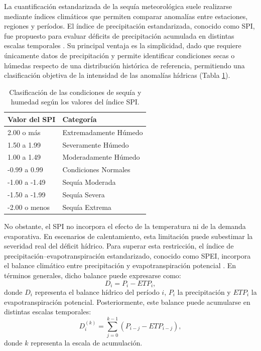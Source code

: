 \documentclass[11pt,a4paper]{article}
\begin{document}
La cuantificación estandarizada de la sequía meteorológica suele realizarse mediante índices climáticos que permiten comparar anomalías entre estaciones, regiones y períodos. El índice de precipitación estandarizada, conocido como SPI, fue propuesto para evaluar déficits de precipitación acumulada en distintas escalas temporales \citep{mckee1993}. Su principal ventaja
es la simplicidad, dado que requiere únicamente datos de precipitación y permite identificar condiciones secas o húmedas respecto de una distribución histórica de referencia, permitiendo una clasificación objetiva de la intensidad de las anomalías hídricas (Tabla \ref{tab:clasificacion_spi}).
\begin{table}[ht!]
    \centering
    \begin{threeparttable}
    \caption{Clasificación de las condiciones de sequía y humedad según los valores del índice SPI.}
    \label{tab:clasificacion_spi}
    \vspace{-0.5cm}
    \singlespacing %
    \small         %
    \begin{tabular}{p{5cm}p{4.5cm}}
    \hline\hline
    \textbf{Valor del SPI} & \textbf{Categoría} \\ \hline
    2.00 o más & Extremadamente Húmedo \\
    1.50 a 1.99 & Severamente Húmedo \\
    1.00 a 1.49 & Moderadamente Húmedo \\
    -0.99 a 0.99 & Condiciones Normales \\
    -1.00 a -1.49 & Sequía Moderada \\
    -1.50 a -1.99 & Sequía Severa \\
    -2.00 o menos & Sequía Extrema \\ \hline\hline
    \end{tabular}
    \end{threeparttable}
\end{table}

No obstante, el SPI no incorpora el efecto de la temperatura ni de la demanda evaporativa. En escenarios de calentamiento, esta limitación puede subestimar la severidad real del déficit hídrico. Para superar esta restricción, el índice de precipitación–evapotranspiración estandarizado, conocido como SPEI, incorpora el balance climático entre precipitación y evapotranspiración potencial \citep{vicenteserrano2010}. En términos generales, dicho balance puede expresarse como:
\begin{equation}
    D_i = P_i - ETP_i,
\end{equation}
donde $D_i$ representa el balance hídrico del período $i$, $P_i$ la precipitación y $ETP_i$ la evapotranspiración potencial. Posteriormente, este balance puede acumularse en distintas escalas temporales:
\begin{equation}
D_i^{(k)} = \sum_{j=0}^{k-1} (P_{i-j} - ETP_{i-j}),
\end{equation}
donde $k$ representa la escala de acumulación. 
\end{document}
